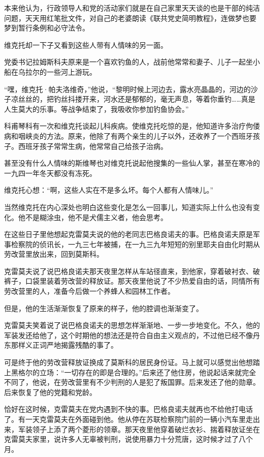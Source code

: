 本来他认为，行政领导人和党的活动家们就是在自己家里天天谈的也是干部的纯洁问题，天天用红笔批文件，对自己的老婆朗读《联共党史简明教程》，连做梦也要梦到暂行条例和必守法令。

维克托却一下子又看到这些人带有人情味的另一面。

党委书记拉姆斯科夫原来是一个喜欢钓鱼的人，战前他常常和妻子、儿子一起坐小船在乌拉尔的一些河上游玩。

“嘿，维克托·帕夫洛维奇，”他说，“黎明时候上河边去，露水亮晶晶的，河边的沙子凉丝丝的，把钓丝抖搂开来，河水还是郁郁的，毫无声息，等着你垂钓……真是人生莫大的乐事。等战争结束了，我吸收你参加钓鱼协会。”

科甫琴科有一次和维克托谈起儿科疾病。使维克托吃惊的是，他知道许多治疗佝偻病和咽峡炎的方法。原来，他除了有两个亲生的儿子以外，还收养了一个西班牙孩子。西班牙孩子常常生病，他常常自己给孩子治病。

甚至没有什么人情味的斯维琴也对维克托说起他搜集的一些仙人掌，甚至在寒冷的一九四一年冬天都没有冻死。

维克托心想：“啊，这些人实在不是多么坏。每个人都有人情味儿。”

当然维克托在内心深处也明白这些变化是怎么一回事儿，知道实际上什么也没有变化。他不是糊涂虫，他不是犬儒主义者，他会思考。

在这些日子里他想起克雷莫夫说的他的老同志巴格良诺夫的事。巴格良诺夫原是军事检察院的侦讯长，一九三七年被捕，在一九三九年短短的别里耶夫自由化时期从劳改营里放出来，回到莫斯科。

克雷莫夫说了说巴格良诺夫那天夜里怎样从车站径直来，到他家，穿着破衬衣、破裤子，口袋里装着劳改营的释放证。那天夜里他说了不少热爱自由的话，同情所有劳改营里的人，准备今后做一个养蜂人和园林工作者。

但是，他的生活渐渐恢复了原来的样子，他的腔调也渐渐变了。

克雷莫夫笑着说了说巴格良诺夫的思想怎样渐渐地、一步一步地变化。不久，他的军装发还给他了，这个时期他的想法还是符合自由主义观点的，不过他已经不像丹东那样义正词严地揭露残酷的事了。

可是终于他的劳改营释放证换成了莫斯科的居民身份证。马上就可以感觉出他想踏上黑格尔的立场：“一切存在的即是合理的。”后来还了他住房，他说起话来就完全不同了，他说，在劳改营里有不少判刑的人是犯了叛国罪。后来发还了他的勋章。后来恢复了他的党籍和党龄。

恰好在这时候，克雷莫夫在党内遇到不快的事。巴格良诺夫就再也不给他打电话了。有一天克雷莫夫在外面碰到他。他从停在苏联检察院门前的一辆小汽车里走出来，军装领子上添了两个菱形的领章。那天夜里他穿着破烂衣衫、揣着释放证坐在克雷莫夫家里，说许多人无辜被判刑，说使用暴力十分荒唐，这时候才过了八个月。

